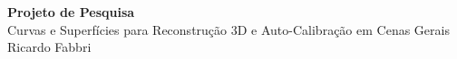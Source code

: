 \begin{titlepage}
\renewcommand{\title}{%
  {\huge\textbf{\textsf{Projeto de Pesquisa}}}\\[40pt]
{\huge{\textsf{Curvas e Superfícies para Reconstrução 3D e Auto-Calibração em Cenas Gerais}}}\\[40pt]%
}
\renewcommand{\author}{{\Large \textsf{Ricardo Fabbri}}}
\renewcommand{\date}{\textsf{IPRJ--UERJ}\\\textsf{Abril de 2012}}
\newcommand{\info}{%
\texttt{[image: figs/logoIPRJ.eps]}\\
%
%
 \date
}

\newlength{\topToTitle} 
\setlength{\topToTitle}{90pt}

\newlength{\leftToTitle} 
\setlength{\leftToTitle}{0pt}

\newlength{\titleToInfo} 
\setlength{\titleToInfo}{11cm}



\thispagestyle{empty}
\vspace*{\topToTitle}
\begin{center}
    \vspace{1.5cm}
    \title
    \author


\end{center}
\end{titlepage}
